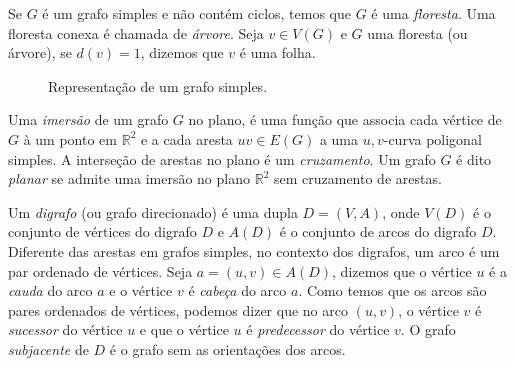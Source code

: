 Se $G$ é um grafo simples e não contém ciclos, temos que $G$ é uma \emph{floresta}. Uma floresta conexa é chamada de \emph{árvore}. Seja $v \in V(G)$ e $G$ uma floresta (ou árvore), se $d(v) = 1$, dizemos que $v$ é uma folha.

\begin{figure}[ht]
    \centering
    \caption{Representação de um grafo simples.}\label{fig:peixe}
\end{figure}

Uma \emph{imersão} de um grafo $G$ no plano, é uma função que associa cada vértice de $G$ à um ponto em $\mathbb{R}^2$ e a cada aresta $uv \in E(G)$ a uma $u,v$-curva poligonal simples. A interseção de arestas no plano é um \emph{cruzamento}. Um grafo $G$ é dito \emph{planar} se admite uma imersão no plano $\mathbb{R}^2$ sem cruzamento de arestas.

Um \emph{digrafo} (ou grafo direcionado) é uma dupla $D=(V,A)$, onde $V(D)$ é o conjunto de vértices do digrafo $D$ e $A(D)$ é o conjunto de arcos do digrafo $D$. Diferente das arestas em grafos simples, no contexto dos digrafos, um arco é um par ordenado de vértices. Seja $a=(u,v) \in A(D)$, dizemos que o vértice $u$ é a \emph{cauda} do arco $a$ e o vértice $v$ é \emph{cabeça} do arco $a$. Como temos que os arcos são pares ordenados de vértices, podemos dizer que no arco $(u,v)$, o vértice $v$ é \emph{sucessor} do vértice $u$ e que o vértice $u$ é \emph{predecessor} do vértice $v$. O grafo \emph{subjacente} de $D$ é o grafo sem as orientações dos arcos. 


